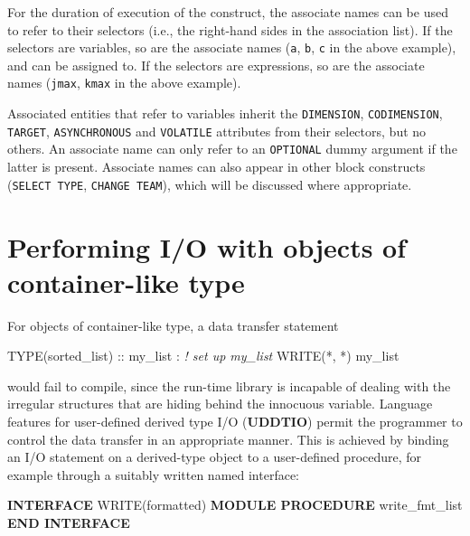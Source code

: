 \documentclass[]{scrartcl}
\newenvironment{Shaded}{}{}
\newcommand{\CommentTok}[1]{\textcolor[rgb]{0.38,0.63,0.69}{\textit{#1}}}
\newcommand{\DataTypeTok}[1]{\textcolor[rgb]{0.56,0.13,0.00}{#1}}
\newcommand{\FunctionTok}[1]{\textcolor[rgb]{0.02,0.16,0.49}{#1}}
\newcommand{\KeywordTok}[1]{\textcolor[rgb]{0.00,0.44,0.13}{\textbf{#1}}}
\newcommand{\NormalTok}[1]{#1}
\begin{document}
For the duration of execution of the construct, the associate names can
be used to refer to their selectors (i.e., the right-hand sides in the
association list). If the selectors are variables, so are the associate
names (\texttt{a}, \texttt{b}, \texttt{c} in the above example), and can
be assigned to. If the selectors are expressions, so are the associate
names (\texttt{jmax}, \texttt{kmax} in the above example).

Associated entities that refer to variables inherit the
\texttt{DIMENSION}, \texttt{CODIMENSION}, \texttt{TARGET},
\texttt{ASYNCHRONOUS} and \texttt{VOLATILE} attributes from their
selectors, but no others. An associate name can only refer to an
\texttt{OPTIONAL} dummy argument if the latter is present. Associate
names can also appear in other block constructs (\texttt{SELECT\ TYPE},
\texttt{CHANGE\ TEAM}), which will be discussed where appropriate.

\section{Performing I/O with objects of container-like
type}\label{performing-io-with-objects-of-container-like-type}

For objects of container-like type, a data transfer statement

\begin{Shaded}
\begin{Highlighting}[]
\DataTypeTok{TYPE(sorted\_list)} \DataTypeTok{::}\NormalTok{ my\_list}
\NormalTok{: }\CommentTok{! set up my\_list}
\FunctionTok{WRITE(*}\NormalTok{, }\FunctionTok{*)}\NormalTok{ my\_list}
\end{Highlighting}
\end{Shaded}

would fail to compile, since the run-time library is incapable of
dealing with the irregular structures that are hiding behind the
innocuous variable. Language features for user-defined derived type I/O
(\textbf{UDDTIO}) permit the programmer to control the data transfer in
an appropriate manner. This is achieved by binding an I/O statement on a
derived-type object to a user-defined procedure, for example through a
suitably written named interface:

\begin{Shaded}
\begin{Highlighting}[]
\KeywordTok{INTERFACE} \FunctionTok{WRITE(formatted)}
   \KeywordTok{MODULE PROCEDURE}\NormalTok{ write\_fmt\_list}
\KeywordTok{END INTERFACE}
\end{Highlighting}
\end{Shaded}
\end{document}
